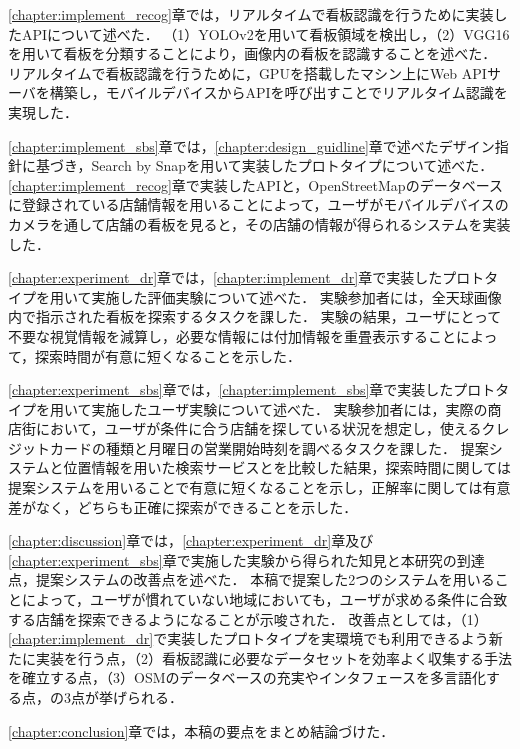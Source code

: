   \ref{chapter:implement_recog}章では，リアルタイムで看板認識を行うために実装したAPIについて述べた．
  （1）YOLOv2を用いて看板領域を検出し，（2）VGG16を用いて看板を分類することにより，画像内の看板を認識することを述べた．
  リアルタイムで看板認識を行うために，GPUを搭載したマシン上にWeb APIサーバを構築し，モバイルデバイスからAPIを呼び出すことでリアルタイム認識を実現した．

  \ref{chapter:implement_sbs}章では，\ref{chapter:design_guidline}章で述べたデザイン指針に基づき，Search by Snapを用いて実装したプロトタイプについて述べた．
  \ref{chapter:implement_recog}章で実装したAPIと，OpenStreetMapのデータベースに登録されている店舗情報を用いることによって，ユーザがモバイルデバイスのカメラを通して店舗の看板を見ると，その店舗の情報が得られるシステムを実装した．

  \ref{chapter:experiment_dr}章では，\ref{chapter:implement_dr}章で実装したプロトタイプを用いて実施した評価実験について述べた．
  実験参加者には，全天球画像内で指示された看板を探索するタスクを課した．
  実験の結果，ユーザにとって不要な視覚情報を減算し，必要な情報には付加情報を重畳表示することによって，探索時間が有意に短くなることを示した．

  \ref{chapter:experiment_sbs}章では，\ref{chapter:implement_sbs}章で実装したプロトタイプを用いて実施したユーザ実験について述べた．
  実験参加者には，実際の商店街において，ユーザが条件に合う店舗を探している状況を想定し，使えるクレジットカードの種類と月曜日の営業開始時刻を調べるタスクを課した．
  提案システムと位置情報を用いた検索サービスとを比較した結果，探索時間に関しては提案システムを用いることで有意に短くなることを示し，正解率に関しては有意差がなく，どちらも正確に探索ができることを示した．

  \ref{chapter:discussion}章では，\ref{chapter:experiment_dr}章及び\ref{chapter:experiment_sbs}章で実施した実験から得られた知見と本研究の到達点，提案システムの改善点を述べた．
  本稿で提案した2つのシステムを用いることによって，ユーザが慣れていない地域においても，ユーザが求める条件に合致する店舗を探索できるようになることが示唆された．
  改善点としては，（1）\ref{chapter:implement_dr}で実装したプロトタイプを実環境でも利用できるよう新たに実装を行う点，（2）看板認識に必要なデータセットを効率よく収集する手法を確立する点，（3）OSMのデータベースの充実やインタフェースを多言語化する点，の3点が挙げられる．

  \ref{chapter:conclusion}章では，本稿の要点をまとめ結論づけた．